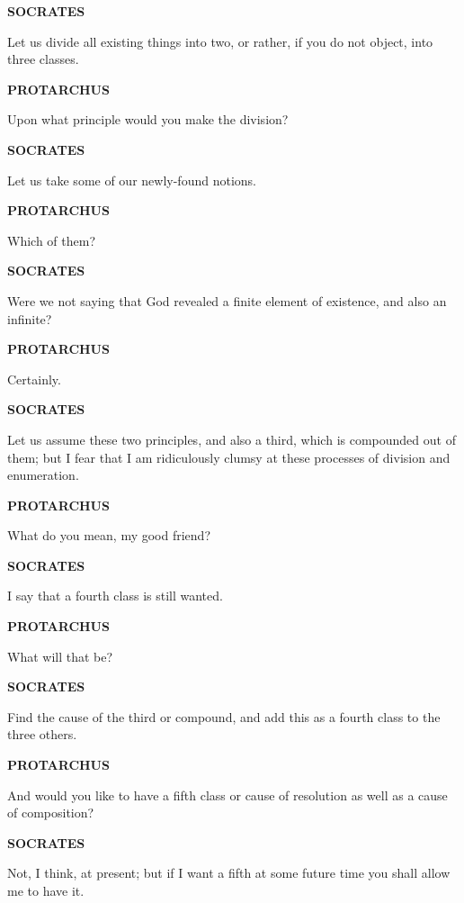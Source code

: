 \documentclass[11pt,letter]{article}
\begin{document}
\par \textbf{SOCRATES}
\par   Let us divide all existing things into two, or rather, if you do not object, into three classes.

\par \textbf{PROTARCHUS}
\par   Upon what principle would you make the division?

\par \textbf{SOCRATES}
\par   Let us take some of our newly-found notions.

\par \textbf{PROTARCHUS}
\par   Which of them?

\par \textbf{SOCRATES}
\par   Were we not saying that God revealed a finite element of existence, and also an infinite?

\par \textbf{PROTARCHUS}
\par   Certainly.

\par \textbf{SOCRATES}
\par   Let us assume these two principles, and also a third, which is compounded out of them; but I fear that I am ridiculously clumsy at these processes of division and enumeration.

\par \textbf{PROTARCHUS}
\par   What do you mean, my good friend?

\par \textbf{SOCRATES}
\par   I say that a fourth class is still wanted.

\par \textbf{PROTARCHUS}
\par   What will that be?

\par \textbf{SOCRATES}
\par   Find the cause of the third or compound, and add this as a fourth class to the three others.

\par \textbf{PROTARCHUS}
\par   And would you like to have a fifth class or cause of resolution as well as a cause of composition?

\par \textbf{SOCRATES}
\par   Not, I think, at present; but if I want a fifth at some future time you shall allow me to have it.
\end{document}
